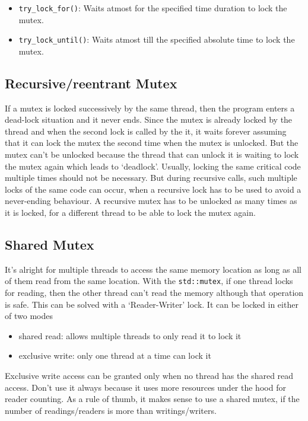 \documentclass{scrartcl}
\begin{document}
\begin{itemize}
	\item \texttt{try_lock_for()}: Waits atmost for the specified time duration to lock the mutex.
	\item \texttt{try_lock_until()}: Waits atmost till the specified absolute time to lock the mutex.
\end{itemize}

\subsection{Recursive/reentrant Mutex}
If a mutex is locked successively by the same thread, then the program enters a dead-lock situation and it never ends. Since the mutex is already locked by the thread and when the second lock is called by the it, it waits forever assuming that it can lock the mutex the second time when the mutex is unlocked. But the mutex can't be unlocked because the thread that can unlock it is waiting to lock the mutex again which leads to `deadlock'. Usually, locking the same critical code multiple times should not be necessary. But during recursive calls, such multiple locks of the same code can occur, when a recursive lock has to be used to avoid a never-ending behaviour. A recursive mutex has to be unlocked as many times as it is locked, for a different thread to be able to lock the mutex again. 

\subsection{Shared Mutex}
It's alright for multiple threads to access the same memory location as long as all of them read from the same location. With the \texttt{std::mutex}, if one thread locks for reading, then the other thread can't read the memory although that operation is safe. This can be solved with a `Reader-Writer' lock. It can be locked in either of two modes

\begin{itemize}
    \item shared read: allows multiple threads to only read it to lock it
    \item exclusive write: only one thread at a time can lock it
\end{itemize}

Exclusive write access can be granted only when no thread has the shared read access. Don't use it always because it uses more resources under the hood for reader counting. As a rule of thumb, it makes sense to use a shared mutex, if the number of readings/readers is more than writings/writers.
\end{document}
